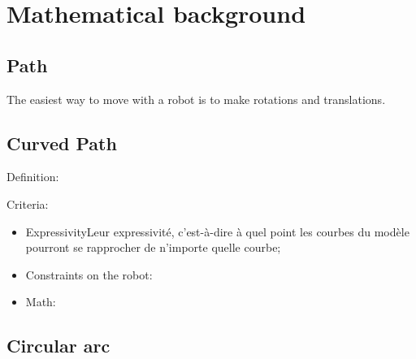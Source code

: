 \documentclass[11pt]{article}
\begin{document}
    \section{Mathematical background}\label{sec:mathematicalBackground}

    \subsection{Path}\label{subsec:path}
    The easiest way to move with a robot is to make rotations and translations.
    \subsection{Curved Path}\label{subsec:curvedPath}
    Definition:

    Criteria:
    \begin{itemize}
        \item ExpressivityLeur expressivité, c'est-à-dire à quel point les courbes du modèle pourront se rapprocher de n'importe quelle courbe;
        \item Constraints on the robot: %
        \item Math: %
    \end{itemize}

    \subsection{Circular arc}\label{subsec:circularArc}
\end{document}
